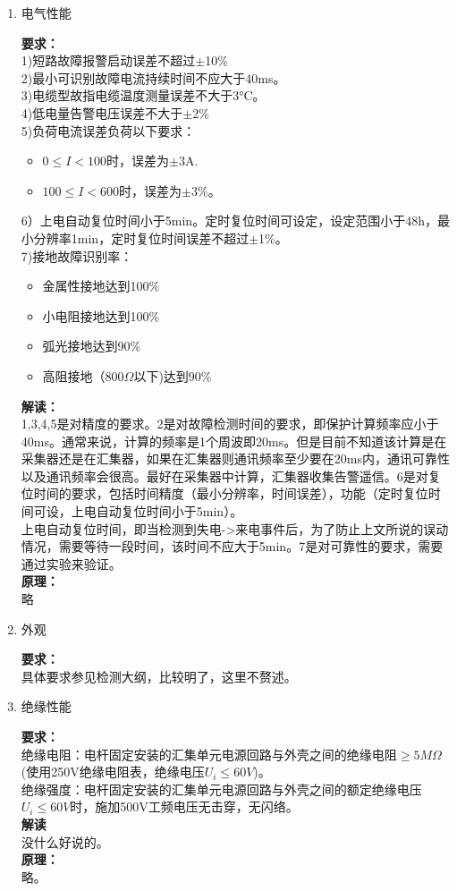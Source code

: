 \documentclass{article}
\begin{document}
\begin{CJK}{UTF8}{gbsn}
\begin{enumerate}
\item 电气性能
	\par
	\textbf{要求：}\\
	1)短路故障报警启动误差不超过$\pm$10\%\\
	2)最小可识别故障电流持续时间不应大于40ms。\\
	3)电缆型故指电缆温度测量误差不大于3°C。\\
	4)低电量告警电压误差不大于$\pm$2\%\\
	5)负荷电流误差负荷以下要求：
	\begin{itemize}
			\item $0\leq I < 100$时，误差为$\pm$3A.
			\item$100\leq I < 600$时，误差为$\pm$3\%。
	\end{itemize}
	6）上电自动复位时间小于5min。定时复位时间可设定，设定范围小于48h，最小分辨率1min，定时复位时间误差不超过$\pm$1\%。\\
	7)接地故障识别率：
	\begin{itemize}
			\item 金属性接地达到100\%
			\item 小电阻接地达到100\%
			\item 弧光接地达到90\%
			\item 高阻接地（800$\Omega$以下)达到90\%
	\end{itemize}
	\textbf{解读：}\\
	1,3,4,5是对精度的要求。2是对故障检测时间的要求，即保护计算频率应小于40ms。通常来说，计算的频率是1个周波即20ms。但是目前不知道该计算是在采集器还是在汇集器，如果在汇集器则通讯频率至少要在20ms内，通讯可靠性以及通讯频率会很高。最好在采集器中计算，汇集器收集告警遥信。6是对复位时间的要求，包括时间精度（最小分辨率，时间误差），功能（定时复位时间可设，上电自动复位时间小于5min）。\\上电自动复位时间，即当检测到失电->来电事件后，为了防止上文所说的误动情况，需要等待一段时间，该时间不应大于5min。7是对可靠性的要求，需要通过实验来验证。\\
	\textbf{原理：}\\
	略
\item 外观 
	\par
	\textbf{要求：}\\
	具体要求参见检测大纲，比较明了，这里不赘述。

\item 绝缘性能
	\par
	\textbf{要求：}\\
	绝缘电阻：电杆固定安装的汇集单元电源回路与外壳之间的绝缘电阻$\geq 5M\Omega$(使用250V绝缘电阻表，绝缘电压$U_i\leq 60V$)。\\
	绝缘强度：电杆固定安装的汇集单元电源回路与外壳之间的额定绝缘电压$U_i \leq 60V$时，施加500V工频电压无击穿，无闪络。\\
	\textbf{解读}\\
	没什么好说的。\\
	\textbf{原理：}\\
	略。


\end{enumerate}
\end{CJK}
\end{document}
